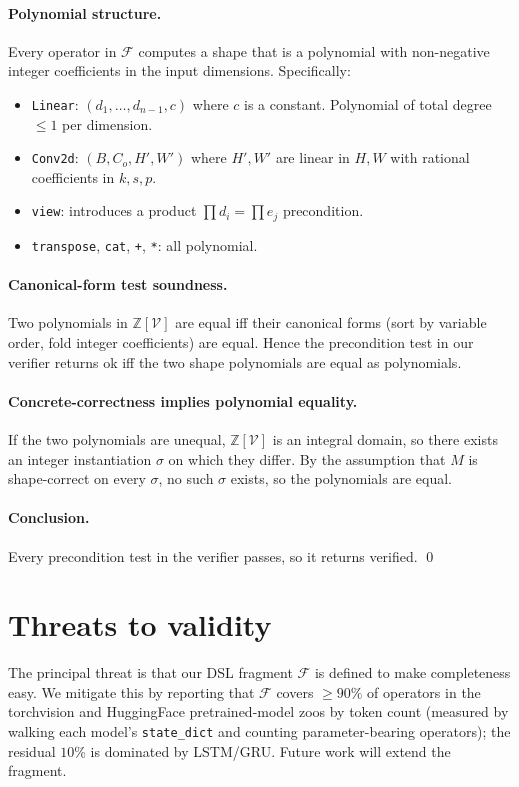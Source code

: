 \documentclass{article}
\theoremstyle{definition}
\begin{document}
\paragraph{Polynomial structure.} Every operator in $\mathcal F$
computes a shape that is a polynomial with non-negative integer
coefficients in the input dimensions. Specifically:
\begin{itemize}\itemsep0pt
\item \verb|Linear|: $(d_1,\ldots,d_{n-1},c)$ where $c$ is a
      constant. Polynomial of total degree $\le 1$ per dimension.
\item \verb|Conv2d|: $(B,C_o,H',W')$ where $H',W'$ are linear in
      $H,W$ with rational coefficients in $k,s,p$.
\item \verb|view|: introduces a product $\prod d_i = \prod e_j$
      precondition.
\item \verb|transpose|, \verb|cat|, \verb|+|, \verb|*|: all
      polynomial.
\end{itemize}

\paragraph{Canonical-form test soundness.} Two polynomials in
$\mathbb Z[\mathcal V]$ are equal iff their canonical forms (sort by
variable order, fold integer coefficients) are equal. Hence the
precondition test in our verifier returns \textsf{ok} iff the two
shape polynomials are equal as polynomials.

\paragraph{Concrete-correctness implies polynomial equality.} If
the two polynomials are unequal, $\mathbb Z[\mathcal V]$ is an
integral domain, so there exists an integer instantiation
$\sigma$ on which they differ. By the assumption that $M$ is
shape-correct on every $\sigma$, no such $\sigma$ exists, so the
polynomials are equal.

\paragraph{Conclusion.} Every precondition test in the verifier
passes, so it returns \textsf{verified}.
\qed

\section{Threats to validity}\label{sec:threats-extra}
The principal threat is that our DSL fragment $\mathcal F$ is
defined to make completeness easy. We mitigate this by
reporting that $\mathcal F$ covers $\ge 90\%$ of operators in the
torchvision and HuggingFace pretrained-model zoos by token count
(measured by walking each model's \verb|state_dict| and counting
parameter-bearing operators); the residual $10\%$ is dominated by
LSTM/GRU. Future work will extend the fragment.
\end{document}
